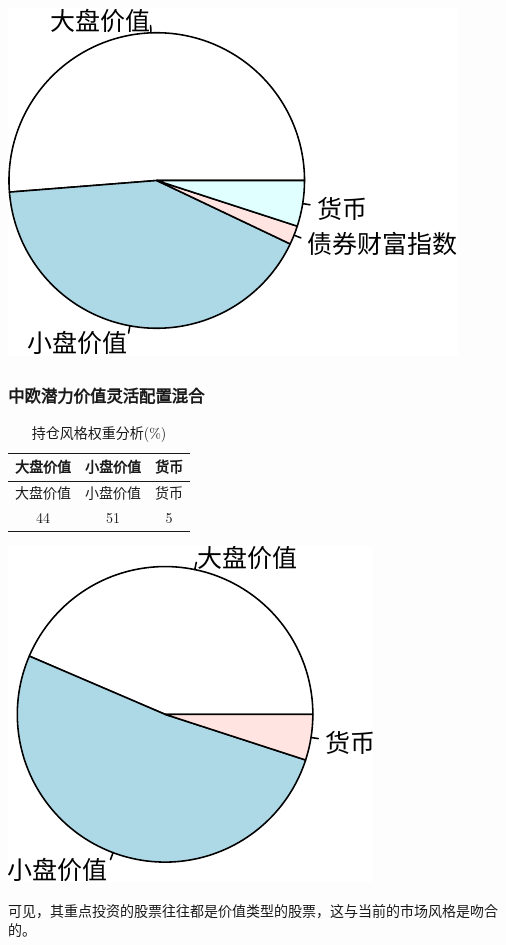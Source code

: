 \documentclass[hyperref,]{ctexart}
\begin{document}
\includegraphics{caominchang-details_files/figure-latex/unnamed-chunk-7-1.pdf}

\subsubsection{中欧潜力价值灵活配置混合}

\begin{longtable}[]{@{}ccc@{}}
\caption{持仓风格权重分析(\%)}\tabularnewline
\toprule
大盘价值 & 小盘价值 & 货币\tabularnewline
\midrule
\endfirsthead
\toprule
大盘价值 & 小盘价值 & 货币\tabularnewline
\midrule
\endhead
44 & 51 & 5\tabularnewline
\bottomrule
\end{longtable}

\includegraphics{caominchang-details_files/figure-latex/unnamed-chunk-8-1.pdf}

可见，其重点投资的股票往往都是价值类型的股票，这与当前的市场风格是吻合的。
\end{document}

